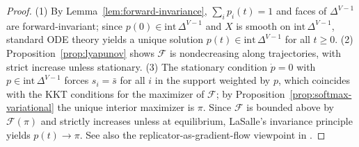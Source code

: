 \documentclass[10pt,a4paper]{amsart}
\numberwithin{equation}{section}
\theoremstyle{plain}
\theoremstyle{definition}
\theoremstyle{remark}
\newcommand{\1}{\mathbbm{1}}
\newcommand{\simplex}{\Delta^{V-1}}
\newcommand{\avgscore}{\bar{s}}
\begin{document}
\begin{proof}
(1) By Lemma~\ref{lem:forward-invariance}, $\sum_i p_i(t)=1$ and faces of $\simplex$ are forward-invariant; since $p(0)\in\mathrm{int}\,\simplex$ and $X$ is smooth on $\mathrm{int}\,\simplex$, standard ODE theory yields a unique solution $p(t)\in\mathrm{int}\,\simplex$ for all $t\ge 0$.
(2) Proposition~\ref{prop:lyapunov} shows $\mathcal{F}$ is nondecreasing along trajectories, with strict increase unless stationary.
(3) The stationary condition $\dot p=0$ with $p\in\mathrm{int}\,\simplex$ forces $s_i=\avgscore$ for all $i$ in the support weighted by $p$, which coincides with the KKT conditions for the maximizer of $\mathcal{F}$; by Proposition~\ref{prop:softmax-variational} the unique interior maximizer is $\pi$. Since $\mathcal{F}$ is bounded above by $\mathcal{F}(\pi)$ and strictly increases unless at equilibrium, LaSalle’s invariance principle yields $p(t)\to \pi$. See also the replicator-as-gradient-flow viewpoint in \citet{shahshahani1979nouvelle,hofbauer1998evolutionary}.
\end{proof}
\end{document}
